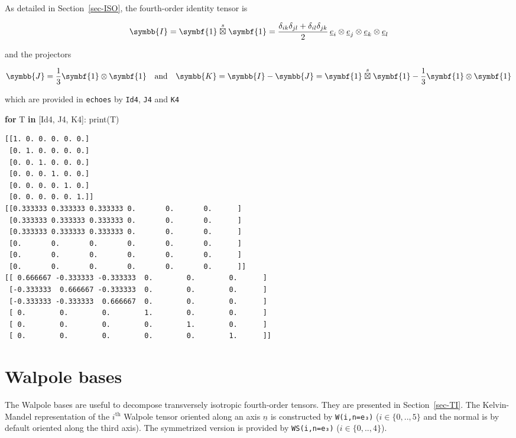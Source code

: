 \documentclass[
  a4paper,
  numbers=noendperiod,
  DIV=12]{scrreprt}
\newenvironment{Shaded}{\begin{snugshade}}{\end{snugshade}}
\newcommand{\BuiltInTok}[1]{#1}
\newcommand{\ControlFlowTok}[1]{\textcolor[rgb]{0.13,0.29,0.53}{\textbf{#1}}}
\newcommand{\KeywordTok}[1]{\textcolor[rgb]{0.13,0.29,0.53}{\textbf{#1}}}
\newcommand{\NormalTok}[1]{#1}
\newcommand{\uu}[1]{{\symbf{{#1}}}}
\newcommand{\uuuu}[1]{{\symbb{{#1}}}}
\newcommand{\uv}[1]{{\underline{{#1}}}}
\newcommand{\ve}[1]{{\uv{{e}}_{{#1}}}}
\newcommand{\n}{{\uv{{n}}}}
\newcommand{\sboxtimes}{\stackrel{s}{\boxtimes}}
\begin{document}
As detailed in Section~\ref{sec-ISO}, the fourth-order identity tensor
is

\[
\uuuu{I}=\uu{1}\sboxtimes\uu{1}=
\frac{\delta_{ik}\delta_{jl}+\delta_{il}\delta_{jk}}{2}\,\ve{i}\otimes\ve{j}\otimes\ve{k}\otimes\ve{l}
\]

and the projectors

\[
\uuuu{J}=\frac{1}{3}\uu{1}\otimes\uu{1}
\quad \textrm{and} \quad
\uuuu{K}=\uuuu{I}-\uuuu{J}=\uu{1}\sboxtimes\uu{1}-\frac{1}{3}\uu{1}\otimes\uu{1}
\]

which are provided in \texttt{echoes} by \texttt{Id4}, \texttt{J4} and
\texttt{K4}

\begin{Shaded}
\begin{Highlighting}[]
\ControlFlowTok{for}\NormalTok{ T }\KeywordTok{in}\NormalTok{ [Id4, J4, K4]:}
    \BuiltInTok{print}\NormalTok{(T)}
\end{Highlighting}
\end{Shaded}

\begin{verbatim}
[[1. 0. 0. 0. 0. 0.]
 [0. 1. 0. 0. 0. 0.]
 [0. 0. 1. 0. 0. 0.]
 [0. 0. 0. 1. 0. 0.]
 [0. 0. 0. 0. 1. 0.]
 [0. 0. 0. 0. 0. 1.]]
[[0.333333 0.333333 0.333333 0.       0.       0.      ]
 [0.333333 0.333333 0.333333 0.       0.       0.      ]
 [0.333333 0.333333 0.333333 0.       0.       0.      ]
 [0.       0.       0.       0.       0.       0.      ]
 [0.       0.       0.       0.       0.       0.      ]
 [0.       0.       0.       0.       0.       0.      ]]
[[ 0.666667 -0.333333 -0.333333  0.        0.        0.      ]
 [-0.333333  0.666667 -0.333333  0.        0.        0.      ]
 [-0.333333 -0.333333  0.666667  0.        0.        0.      ]
 [ 0.        0.        0.        1.        0.        0.      ]
 [ 0.        0.        0.        0.        1.        0.      ]
 [ 0.        0.        0.        0.        0.        1.      ]]
\end{verbatim}

\section{Walpole bases}\label{walpole-bases}

The Walpole bases are useful to decompose transversely isotropic
fourth-order tensors. They are presented in Section~\ref{sec-TI}. The
Kelvin-Mandel representation of the \(i^\textrm{th}\) Walpole tensor
oriented along an axis \(\n\) is constructed by \texttt{W(i,n=e₃)}
(\(i \in \{0,..,5\}\) and the normal is by default oriented along the
third axis). The symmetrized version is provided by \texttt{WS(i,n=e₃)}
(\(i \in \{0,..,4\}\)).
\end{document}
